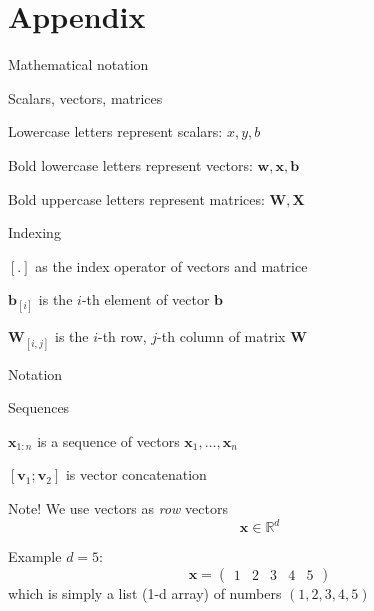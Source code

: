 \documentclass[12pt,aspectratio=169,handout]{beamer}
\begin{document}
\appendix

\section*{Appendix}


\begin{frame}{Mathematical notation}

\begin{block}{Scalars, vectors, matrices}

Lowercase letters represent scalars: $x, y, b$
	
Bold lowercase letters represent vectors: $\bm{w}, \bm{x}, \bm{b}$

Bold uppercase letters represent matrices: $\bm{W}, \bm{X}$

\end{block}

\begin{block}{Indexing}
	
$[ . ]$ as the index operator of vectors and matrice

$\bm{b}_{[i]}$ is the $i$-th element of vector $\bm{b}$

$\bm{W}_{[i,j]}$ is the $i$-th row, $j$-th column of matrix $\bm{W}$
\end{block}

\end{frame}


\begin{frame}{Notation}
	
\begin{block}{Sequences}

$\bm{x}_{1:n}$ is a sequence of vectors $\bm{x}_1, \ldots, \bm{x}_n$

$[\bm{v}_1 ; \bm{v}_2]$ is vector concatenation
	
\end{block}
	
\begin{block}{Note! We use vectors as \emph{row} vectors}
$$
\bm{x} \in \mathbb{R}^{d}
$$
\end{block}

Example $d = 5$:
$$
\bm{x} = \begin{pmatrix}
1 & 2 & 3 & 4 & 5
\end{pmatrix}
$$
which is simply a list (1-d array) of numbers $(1, 2, 3, 4, 5)$

\end{frame}
\end{document}

